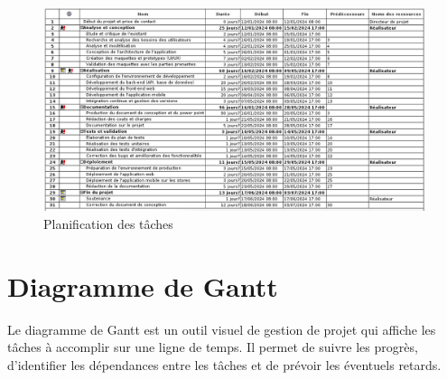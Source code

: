\begin{figure}[H]
  \includegraphics[width=1\textwidth]{capture/task.png}
  \caption{Planification des tâches}
\end{figure}


\section{Diagramme de Gantt}
Le diagramme de Gantt est un outil visuel de gestion de projet qui affiche les
tâches à accomplir sur une ligne de temps. Il permet de suivre les progrès,
d’identifier les dépendances entre les tâches et de prévoir les éventuels retards.

